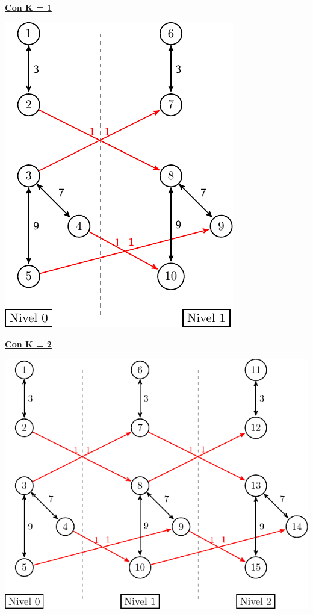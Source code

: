 \begin{minipage}{0.3\textwidth}
	\begin{center}
		\underline{\textbf{Con K = 1}}
		\newline

		\includegraphics[scale=0.75]{imagenes/ej1_ex_k1.pdf}
	\end{center}
\end{minipage}
\hfill
\begin{minipage}{0.45\textwidth}
	\begin{center}
		\underline{\textbf{Con K = 2}}
		\newline

		\includegraphics[scale=0.75]{imagenes/ej1_ex_k2.pdf}
	\end{center}
\end{minipage}

